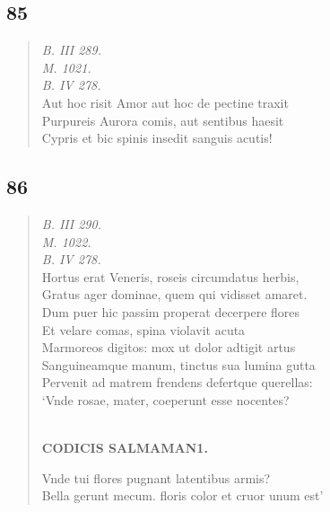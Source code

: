 \documentclass[11pt, a4paper]{report}
\begin{document}
            \subsection*{85}
      \begin{verse}
      \textit{B. III 289.} \\ \textit{M. 1021.} \\ \textit{B. IV 278.} \\ Aut hoc risit Amor aut hoc de pectine traxit \\ Purpureis Aurora comis, aut sentibus haesit \\ Cypris et bic spinis insedit sanguis acutis! \\ 
      \end{verse}
  
            \subsection*{86}
      \begin{verse}
      \textit{B. III 290.} \\ \textit{M. 1022.} \\ \textit{B. IV 278.} \\ Hortus erat Veneris, roseis circumdatus herbis, \\ Gratus ager dominae, quem qui vidisset amaret. \\ Dum puer hic passim properat decerpere flores \\ Et velare comas, spina violavit acuta \\ Marmoreos digitos: mox ut dolor adtigit artus \\ Sanguineamque manum, tinctus sua lumina gutta \\ Pervenit ad matrem frendens defertque querellas: \\ ‘Vnde rosae, mater, coeperunt esse nocentes? \\ 
        ﻿\pagebreak 
    \begin{center} \textbf{CODICIS SALMAMAN1.} \end{center} \marginpar{[0]} Vnde tui flores pugnant latentibus armis? \\ Bella gerunt mecum. floris color et cruor unum est’ \\ 
      \end{verse}
  
\end{document}
